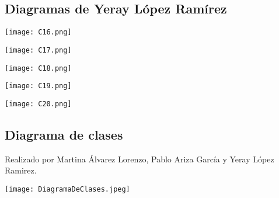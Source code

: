 \documentclass[12pt, spanish]{article}
\begin{document}
\pagebreak

\subsection{Diagramas de Yeray López Ramírez}
\begin{centering}\texttt{[image: C16.png]}\\[1.0 cm]\end{centering}
\begin{centering}\texttt{[image: C17.png]}\\[1.0 cm]\end{centering}
\begin{centering}\texttt{[image: C18.png]}\\[1.0 cm]\end{centering}
\begin{centering}\texttt{[image: C19.png]}\\[1.0 cm]\end{centering}
\begin{centering}\texttt{[image: C20.png]}\\[1.0 cm]\end{centering}

\pagebreak
\begin{landscape}
\thispagestyle{empty}
\section{Diagrama de clases}
Realizado por Martina Álvarez Lorenzo, Pablo Ariza García y Yeray López Ramirez.


\begin{centering}\texttt{[image: DiagramaDeClases.jpeg]}\\[1.0 cm]\end{centering}

\vfill
\raisebox{12pt}{\makebox[\linewidth]{\thepage}}
\end{landscape}
\end{document}
